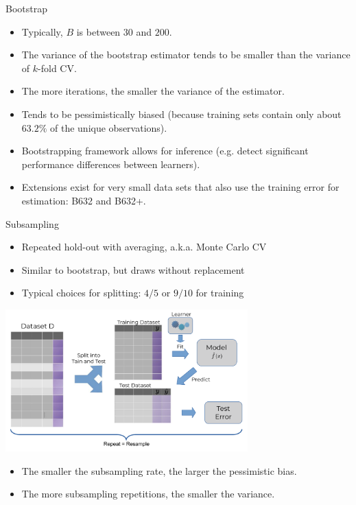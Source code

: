 \documentclass[11pt,compress,t,notes=noshow, xcolor=table]{beamer}
\begin{document}
\begin{vbframe}{Bootstrap}
\framebreak

\begin{itemize}
  \item Typically, $B$ is between $30$ and $200$.
  \item The variance of the bootstrap estimator tends to be smaller than the
  variance of $k$-fold CV.
  \item The more iterations, the smaller the variance of the estimator.
  \item Tends to be pessimistically biased
  (because training sets contain only about $63.2 \%$ of the unique observations).
  \item Bootstrapping framework allows for inference
  (e.g. detect significant performance differences between learners).
  \item Extensions exist for very small data sets that also use the training error for  estimation: B632 and B632+.
\end{itemize}

\end{vbframe}


\begin{vbframe}{Subsampling}

\begin{itemize}
  \item Repeated hold-out with averaging, a.k.a. Monte Carlo CV
  \item Similar to bootstrap, but draws without replacement
  \item Typical choices for splitting: $4/5$ or $9/10$ for training
\end{itemize}
\begin{center}
\includegraphics[width=0.7\textwidth]{figure_man/resampling_error.pdf}
\end{center}
\begin{itemize}
  \item The smaller the subsampling rate, the larger the pessimistic bias.
  \item The more subsampling repetitions, the smaller the variance.
\end{itemize}

\end{vbframe}
\end{document}
